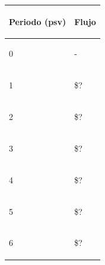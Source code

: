 \begin{spacing}{0.1}
\begin{center}
\begin{tabular}{ |p{3.5cm}| p{3cm}|}
\hline 

\begin{center}\textbf{Periodo (psv) } \end{center}  & \begin{center} \textbf{Flujo} \end{center}  \\ \hline

\begin{center} 0 \end{center}   &  \begin{center} - \end{center}\\\hline

\begin{center}1 \end{center}    &  \begin{center} \$?\end{center} \\ \hline

\begin{center}2 \end{center}    &  \begin{center} \$?\end{center} \\ \hline 

\begin{center}3 \end{center}    & \begin{center} \$?\end{center}  \\ \hline

\begin{center}4 \end{center}    & \begin{center} \$? \end{center}  \\ \hline

\begin{center}5 \end{center}    & \begin{center} \$? \end{center}  \\ \hline

\begin{center}6 \end{center}    & \begin{center} \$? \end{center}  \\ \hline


\end{tabular}
\end{center}
\end{spacing}
